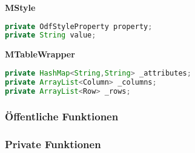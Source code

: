 \textbf{MStyle}

\begin{lstlisting}[label={labelMySqlConnectionParameters},caption=Repräsentation eines Styles einer Libre Office Calc Datei, language=Java]
private OdfStyleProperty property;
private String value;
\end{lstlisting}

\textbf{MTableWrapper}

\begin{lstlisting}[label={labelMySqlConnectionParameters},caption=Repräsentation einer Tabelle einer Libre Office Calc Datei inkl. aller Zeilen und Spalten, language=Java]
private HashMap<String,String> _attributes;
private ArrayList<Column> _columns;
private ArrayList<Row> _rows;
\end{lstlisting}

\subsubsection{Öffentliche Funktionen}
\label{subsubsectionLibreOfficePublicFunctions}

\subsubsection{Private Funktionen}
\label{subsubsectionLibreOfficePrivateFunctions}